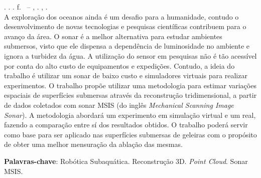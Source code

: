 
\begin{resumo}[RESUMO]
\begin{SingleSpacing}

\imprimirautorcitacao. \imprimirtitulo. \imprimirdata. \pageref {LastPage} f. \imprimirprojeto\ – \imprimirprograma, \imprimirinstituicao. \imprimirlocal, \imprimirdata.\\

A exploração dos oceanos ainda é um desafio para a humanidade, contudo o desenvolvimento de novas tecnologias e pesquisas científicas contribuem para o avanço da área.  
O sonar é a melhor alternativa para estudar ambientes submersos, visto que ele dispensa a dependência de luminosidade no ambiente e ignora a turbidez da água. 
A utilização do sensor em pesquisas não é tão acessível por conta do alto custo de equipamentos e expedições.
Contudo, a ideia do trabalho é utilizar um sonar de baixo custo e simuladores virtuais para realizar experimentos.
O trabalho propõe utilizar uma metodologia para estimar variações espaciais de superfícies submersas através da  reconstrução tridimensional, a partir de dados coletados com sonar MSIS (do inglês \textit{Mechanical Scanning Image Sonar}). 
A metodologia abordará um experimento em simulação virtual e um real, fazendo a comparação entre sí dos resultados obtidos.
O trabalho poderá servir como base para ser aplicado nas superfícies submersas de geleiras com o propósito de obter uma melhor mensuração da ablação das mesmas.


\vspace{2em}
\textbf{Palavras-chave}: Robótica Subaquática. Reconstrução 3D. \textit{Point Cloud}. Sonar MSIS.

\end{SingleSpacing}
\end{resumo}

